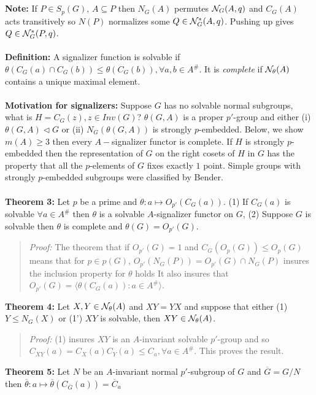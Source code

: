 \\
\\
{\bf Note:} If $P \in S_p(G)$, $A \subseteq P$ then $N_G(A)$ permutes
${\cal N}_{G}(A, q)$ and $C_G(A)$ acts transitively so $N(P)$ normalizes some
$Q \in {\cal N}^{*}_{G}(A, q)$.  Pushing up gives $Q \in{\cal N}^{*}_{G}(P, q)$.
\\
\\
{\bf Definition:} A signalizer function is solvable if
$\theta(C_G(a) \cap C_G(b)) \le \theta(C_G(b)), \forall a, b \in A^{\#}$.  It is
\emph{complete} if ${\cal N}_{\theta}(A)$ contains a unique maximal element.
\\
\\
{\bf Motivation for signalizers:}  Suppose $G$ has no solvable normal subgroups, what is
$H= C_G(z), z \in Inv(G)$?  $\theta(G,A)$ is a proper $p'$-group and either (i)
$\theta(G, A) \lhd G$ or (ii) $N_G(\theta(G,A))$ is strongly $p$-embedded.
Below, we show $m(A) \ge 3$ then every $A-$signalizer functor is complete.  
If $H$ is strongly $p$-embedded then the representation of $G$ on the right
cosets of $H$ in $G$ has the property that all the $p$-elements of $G$ fixes
exactly $1$ point.  Simple groups with strongly $p$-embedded subgroups were classified
by Bender.
\\
\\
{\bf Theorem 3:}
Let $p$ be a prime and $\theta: a \mapsto O_{p'}(C_G(a))$. 
(1) If $C_G(a)$ is
solvable $\forall a \in A^{\#}$ then $\theta$ is a solvable $A$-signalizer
functor on $G$,
(2) Suppose $G$ is solvable then $\theta$ is complete and $\theta(G)= O_{p'}(G)$.
\begin{quote}
\emph{Proof:}  
The theorem that if $O_{p'}(G)=1$ and $C_G(O_p(G)) \le O_p(G)$ means that for
$p \in p(G)$, $O_{p'}(N_G(P)) =O_{p'}(G) \cap N_G(P)$ insures the inclusion property
for $\theta$ holds  It also insures that 
$O_{p'}(G)= \langle \theta(C_G(a)) : a \in A^{\#} \rangle$.
\end{quote}
{\bf Theorem 4:}
Let $X, Y \in {\cal N}_{\theta}(A)$ and $XY = YX$ and suppose that either
(1) $Y \le N_G(X)$ or (1') $XY$ is solvable, then $XY \in {\cal N}_{\theta}(A)$.
\begin{quote}
\emph{Proof:}  
(1) insures $XY$ is an $A$-invariant solvable $p'$-group and so
$C_{XY}(a)= C_X(a) C_Y(a) \le C_a , \forall a \in A^{\#}$.  This proves the result.
\end{quote}
{\bf Theorem 5:}
Let $N$ be an $A$-invariant normal $p'$-subgroup of $G$ and ${\overline G}= G/N$ then
${\overline {\theta}}: a \mapsto {\overline {\theta}}(C_{\overline G}(a))= {\overline C}_a$
